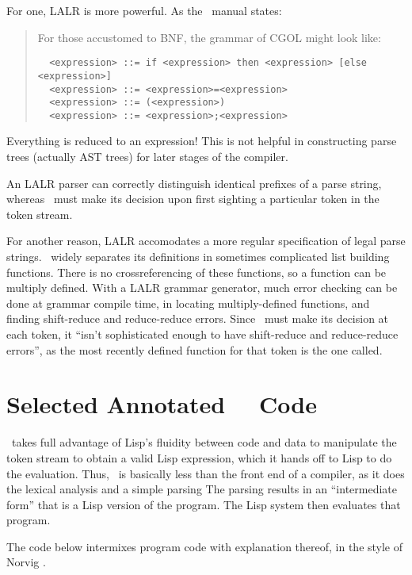 For one, LALR is more powerful.  As the \cgol\ manual states:

\begin{quotation}
For those accustomed to BNF, the grammar of CGOL might look like: 

{\footnotesize\begin{verbatim}
  <expression> ::= if <expression> then <expression> [else <expression>]
  <expression> ::= <expression>=<expression>
  <expression> ::= (<expression>)
  <expression> ::= <expression>;<expression>
\end{verbatim}}
\end{quotation}

Everything is reduced to an expression!  This is not helpful in constructing
parse trees (actually AST trees) for later stages of the compiler.

An LALR parser can correctly distinguish identical prefixes of a
parse string, whereas \cgol\ must make its decision upon first sighting a
particular token in the token stream.

For another reason, LALR accomodates a more regular specification of legal parse
strings.  \cgol\ widely separates its definitions in sometimes complicated
list building functions.  There is no crossreferencing of these functions,
so a function can be multiply defined.  With a LALR grammar generator, much
error checking can be done at grammar compile time, in locating multiply-defined
functions, and finding shift-reduce and reduce-reduce errors.  Since \cgol\
must make its decision at each token, it ``isn't sophisticated enough to
have shift-reduce and reduce-reduce errors'', as the most recently defined
function for that token is the one called.


%
%

\section {Selected Annotated \cl\ \cgol\ Code}

\cgol\ takes full advantage of Lisp's fluidity between code and data to
manipulate the token stream to obtain a valid Lisp expression,  which it
hands off to Lisp to do the evaluation.  Thus, \cgol\ is basically less
than the front end of a compiler, as it does the lexical analysis and a
simple parsing The parsing
results in an ``intermediate form'' that is
a Lisp version of the program. The Lisp system then evaluates that
program.

The code below intermixes program code with explanation thereof, in the
style of Norvig \cite{norvig:para}.

